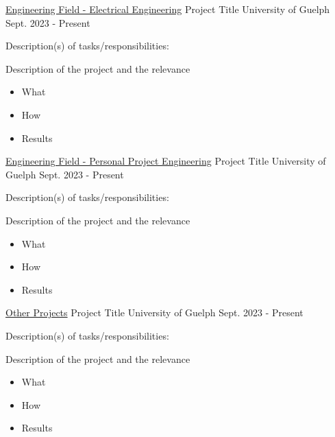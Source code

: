 \begin{cventries}
  \cventry
    {\href{https://github.com/TevHeath}{Engineering Field - Electrical Engineering}} %
    {Project Title } %
    {University of Guelph} %
    {Sept. 2023 - Present} %
     {\renewcommand{\labelitemii}{\bullet}
      \begin{cvitems} Description(s) of tasks/responsibilities:
         \item {Description of the project and the relevance}
        \begin{itemize} 
            \item {What}
            \item{How}
            \item {Results}
        \end{itemize}
      \end{cvitems}
    }

  \cventry
    {\href{https://github.com/TevHeath}{Engineering Field - Personal Project Engineering}} %
    {Project Title } %
    {University of Guelph} %
    {Sept. 2023 - Present} %
     {\renewcommand{\labelitemii}{\bullet}
      \begin{cvitems} Description(s) of tasks/responsibilities:
         \item {Description of the project and the relevance}
        \begin{itemize} 
            \item {What}
            \item{How}
            \item {Results}
        \end{itemize}
      \end{cvitems}
    }

  \cventry
    {\href{https://github.com/TevHeath}{Other Projects}} %
    {Project Title} %
    {University of Guelph} %
    {Sept. 2023 - Present} %
     {\renewcommand{\labelitemii}{\bullet}
      \begin{cvitems} Description(s) of tasks/responsibilities:
         \item {Description of the project and the relevance}
        \begin{itemize} 
            \item {What}
            \item{How}
            \item {Results}
        \end{itemize}
      \end{cvitems}
    }

\end{cventries}